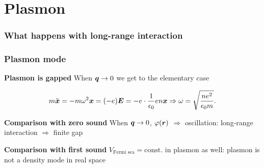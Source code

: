 \documentclass{beamer}
\begin{document}
\section{Plasmon}

\begin{frame}
\frametitle{What happens with long-range interaction}



\end{frame}

\begin{frame}
\frametitle{Plasmon mode}

\textbf{Plasmon is gapped} When $\vb*{q} \to 0$ we get to the elementary case

\begin{center}
    
\end{center}
\begin{equation}
    m \ddot{\vb*{x}} = - m \omega^2 \vb*{x} = (- e) \vb*{E} = - e \cdot \frac{1}{\epsilon_0} e n \vb*{x} 
    \Rightarrow \omega = \sqrt{\frac{n e^2}{\epsilon_0 m}}.
\end{equation}

\vspace{0.25cm}

\textbf{Comparison with zero sound} When $\vb*{q} \to 0$, $\varphi(\vb*{r})$ $\Rightarrow$ oscillation:
long-range interaction $\Rightarrow$ finite gap

\vspace{0.25cm}

\textbf{Comparison with first sound} $V_{\text{Fermi sea}} = \text{const.}$ in plasmon as well:
plasmon is not a density mode in real space

\end{frame}
\end{document}
